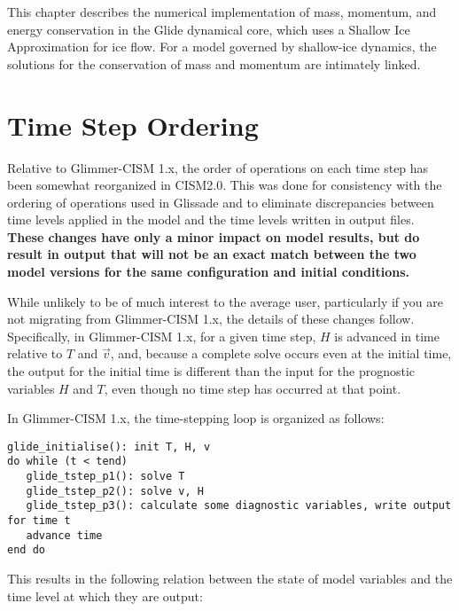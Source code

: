\label{ch:glide}

This chapter describes the numerical implementation of mass, momentum, and energy conservation in the Glide dynamical core,
which uses a Shallow Ice Approximation for ice flow. For a model governed by shallow-ice dynamics, 
the solutions for the conservation of mass and momentum are intimately linked.








\section{Time Step Ordering}

Relative to Glimmer-CISM 1.x, the order of operations on each time step has been
somewhat reorganized in CISM2.0.  This was done for consistency with the ordering
of operations used in Glissade and to eliminate discrepancies between time levels
applied in the model and the time levels written in output files.  
\textbf{These changes have only a minor impact on model results, but do result 
in output that will not be an exact match between the two model versions for the
same configuration and initial conditions.}

While unlikely to be of much interest to the average user, particularly if you are not
migrating from Glimmer-CISM 1.x, the details of these changes follow.
Specifically, in Glimmer-CISM 1.x, for a given time step, $H$ is advanced in time
relative to $T$ and $\vec{v}$, and, because a complete solve occurs even at the 
initial time, the output for the initial time is different than the input for 
the prognostic variables $H$ and $T$, even though no time step has occurred at 
that point.

In Glimmer-CISM 1.x, the time-stepping loop is organized as follows:
\begin{verbatim}
glide_initialise(): init T, H, v
do while (t < tend)
   glide_tstep_p1(): solve T
   glide_tstep_p2(): solve v, H
   glide_tstep_p3(): calculate some diagnostic variables, write output for time t
   advance time
end do
\end{verbatim}

\noindent This results in the following relation between the state of model variables and
the time level at which they are output:

